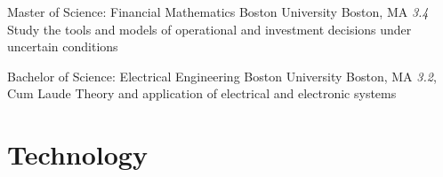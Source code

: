 \documentclass[11pt,letterpaper,roman]{moderncv}
\begin{document}
    {Master of Science: Financial Mathematics}
    {Boston University}
    {Boston, MA}
    {\textit{3.4}}
    {Study the tools and models of operational and investment decisions under uncertain conditions}
\begin{cvcolumns}
  
\end{cvcolumns}
    {Bachelor of Science: Electrical Engineering}
    {Boston University}
    {Boston, MA}
    {\textit{3.2}, Cum Laude}
    {Theory and application of electrical and electronic systems}
\begin{cvcolumns}
  
\end{cvcolumns}

\section{Technology}
\end{document}
